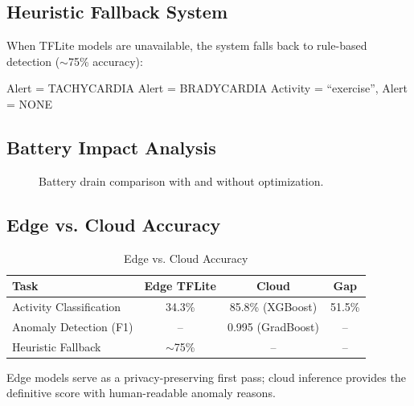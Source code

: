 \subsection{Heuristic Fallback System}
When TFLite models are unavailable, the system falls back to rule-based detection ($\sim$75\% accuracy):
\begin{algorithmic}
    \STATE Alert = TACHYCARDIA
    \STATE Alert = BRADYCARDIA
    \STATE Activity = ``exercise'', Alert = NONE
\ENDIF
\end{algorithmic}

\subsection{Battery Impact Analysis}

\begin{figure}[H]
\centering
{}
\caption{Battery drain comparison with and without optimization.}
\label{fig:battery}
\end{figure}

\subsection{Edge vs. Cloud Accuracy}

\begin{table}[H]
\centering
\caption{Edge vs. Cloud Accuracy}
\label{tab:edge_cloud}
\begin{tabular}{lccc}
\toprule
\textbf{Task} & \textbf{Edge TFLite} & \textbf{Cloud} & \textbf{Gap} \\
\midrule
Activity Classification & 34.3\% & 85.8\% (XGBoost) & 51.5\% \\
Anomaly Detection (F1) & -- & 0.995 (GradBoost) & -- \\
Heuristic Fallback & $\sim$75\% & -- & -- \\
\bottomrule
\end{tabular}
\end{table}

Edge models serve as a privacy-preserving first pass; cloud inference provides the definitive score with human-readable anomaly reasons.

